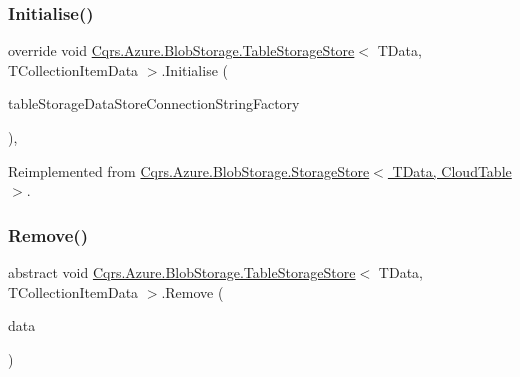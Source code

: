 \mbox{\label{classCqrs_1_1Azure_1_1BlobStorage_1_1TableStorageStore_ae775f039a168cc48c731314c7e494bb6}} 
\subsubsection{\texorpdfstring{Initialise()}{Initialise()}}
{\footnotesize\ttfamily override void \hyperlink{classCqrs_1_1Azure_1_1BlobStorage_1_1TableStorageStore}{Cqrs.\+Azure.\+Blob\+Storage.\+Table\+Storage\+Store}$<$ T\+Data, T\+Collection\+Item\+Data $>$.Initialise (\begin{DoxyParamCaption}\item[{\hyperlink{interfaceCqrs_1_1Azure_1_1BlobStorage_1_1IStorageStoreConnectionStringFactory}{I\+Storage\+Store\+Connection\+String\+Factory}}]{table\+Storage\+Data\+Store\+Connection\+String\+Factory }\end{DoxyParamCaption})\hspace{0.3cm}{\ttfamily [protected]}, {\ttfamily [virtual]}}



Reimplemented from \hyperlink{classCqrs_1_1Azure_1_1BlobStorage_1_1StorageStore_a8d16603267a768190f2c49ca3d1c439e}{Cqrs.\+Azure.\+Blob\+Storage.\+Storage\+Store$<$ T\+Data, Cloud\+Table $>$}.

\mbox{\label{classCqrs_1_1Azure_1_1BlobStorage_1_1TableStorageStore_a8e013351f5dcccd1915bf7ed6c58317e}} 
\subsubsection{\texorpdfstring{Remove()}{Remove()}}
{\footnotesize\ttfamily abstract void \hyperlink{classCqrs_1_1Azure_1_1BlobStorage_1_1TableStorageStore}{Cqrs.\+Azure.\+Blob\+Storage.\+Table\+Storage\+Store}$<$ T\+Data, T\+Collection\+Item\+Data $>$.Remove (\begin{DoxyParamCaption}\item[{T\+Collection\+Item\+Data}]{data }\end{DoxyParamCaption})\hspace{0.3cm}{\ttfamily [pure virtual]}}



